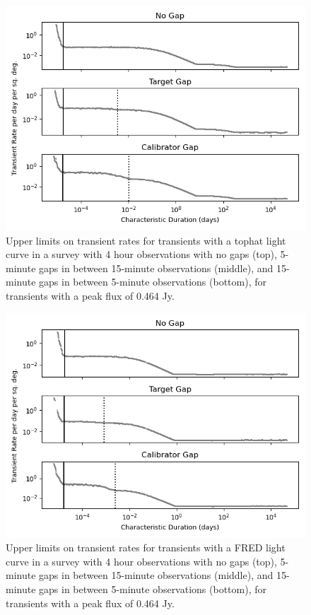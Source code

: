 \documentclass[12pt]{article}
\begin{document}
 \begin{figure}
\includegraphics[width=\columnwidth]{figure5.png}
\caption{Upper limits on transient rates for transients with a tophat light curve in a survey with 4 hour observations with no gaps (top), 5-minute gaps in between 15-minute observations (middle), and 15-minute gaps in between 5-minute observations (bottom), for transients with a peak flux of 0.464 Jy.}
\label{fig5}
 \end{figure}
 
 \begin{figure}
\includegraphics[width=\columnwidth]{figure6.png}
\caption{Upper limits on transient rates for transients with a FRED light curve in a survey with 4 hour observations with no gaps (top), 5-minute gaps in between 15-minute observations (middle), and 15-minute gaps in between 5-minute observations (bottom), for transients with a peak flux of 0.464 Jy.}
\label{fig6}
 \end{figure}
 
\end{document}
